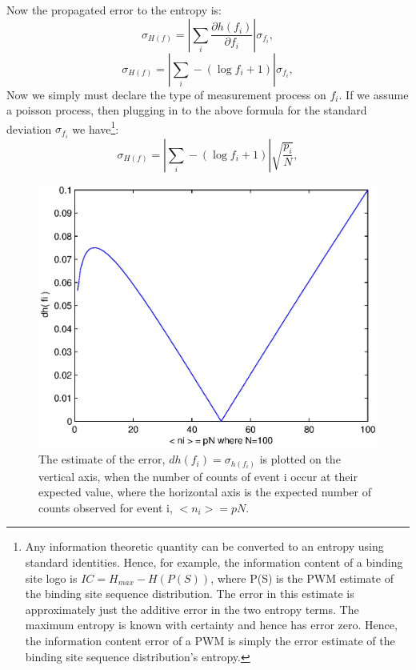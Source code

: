 Now the propagated error to the entropy is:
\begin{equation}
\sigma_{H(f)} = |\sum_i \frac{\partial{h(f_i)}}{\partial{f_i}}| \sigma_{f_i}, 
\end{equation}
  \begin{equation}
\sigma_{H(f)} = |\sum_i-(\log{f_i} +1 ) | \sigma_{f_i},
\end{equation}
  Now we simply must declare the type of measurement process on $f_i$.  If we assume a poisson process, then plugging in to the above formula for the standard deviation $\sigma_{f_i}$ we have\footnote{Any information theoretic quantity can be converted to an entropy using standard identities.  Hence, for example, the information content of a binding site logo is $IC = H_{max} - H(P(S))$, where P(S) is the PWM estimate of the binding site sequence distribution.  The error in this estimate is approximately just the additive error in the two entropy terms.  The maximum entropy is known with certainty and hence has error zero.  Hence, the information content error of a PWM is simply the error estimate of the binding site sequence distribution's entropy. }:
    \begin{equation}
\sigma_{H(f)} = |\sum_i -(\log{f_i} +1 ) | \sqrt{\frac{p_i}{N}},
\end{equation}
\begin{figure}[!htbp]
\includegraphics[width=5in]{entropyN100}
\caption{The estimate of the error, $dh(f_i) = \sigma_{h(f_i)}$ is plotted on the vertical axis, when the number of counts of event i occur at their expected value, where the horizontal axis is the expected number of counts observed for event i, $< n_i >= p N$.  }
\end{figure}\label{entropyerr}
